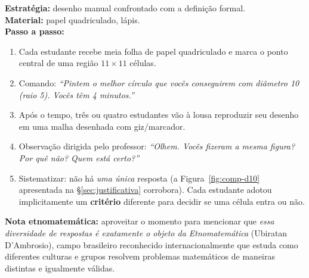\documentclass[12pt,a4paper]{scrartcl}
\newcommand{\acc}[1]{\textcolor{accent}{\textbf{#1}}}
\newcommand{\tempo}[1]{\textnormal{\footnotesize\color{bg!90!white}\textsf{#1}}}
\begin{document}
\begin{atividade}[1.2 --- Problematização \quad\tempo{15 min}]
\textbf{Estratégia:} desenho manual confrontado com a definição formal. \\[0.4em]
\textbf{Material:} papel quadriculado, lápis. \\[0.4em]
\textbf{Passo a passo:}
\begin{enumerate}[leftmargin=1.5em,itemsep=0.2em,topsep=0.3em,nosep]
  \item Cada estudante recebe meia folha de papel quadriculado e marca o ponto central de uma região $11 \times 11$ células.
  \item Comando: \emph{``Pintem o melhor círculo que vocês conseguirem com diâmetro 10 (raio 5). Vocês têm 4 minutos.''}
  \item Após o tempo, três ou quatro estudantes vão à lousa reproduzir seu desenho em uma malha desenhada com giz/marcador.
  \item Observação dirigida pelo professor: \emph{``Olhem. Vocês fizeram a mesma figura? Por quê não? Quem está certo?''}
  \item Sistematizar: não há \emph{uma única} resposta (a Figura~\ref{fig:comp-d10} apresentada na §\ref{sec:justificativa} corrobora). Cada estudante adotou implicitamente um \acc{critério} diferente para decidir se uma célula entra ou não.
\end{enumerate}

\textbf{Nota etnomatemática:} aproveitar o momento para mencionar que \emph{essa diversidade de respostas é exatamente o objeto da Etnomatemática} (Ubiratan D'Ambrosio), campo brasileiro reconhecido internacionalmente que estuda como diferentes culturas e grupos resolvem problemas matemáticos de maneiras distintas e igualmente válidas.
\end{atividade}
\end{document}
